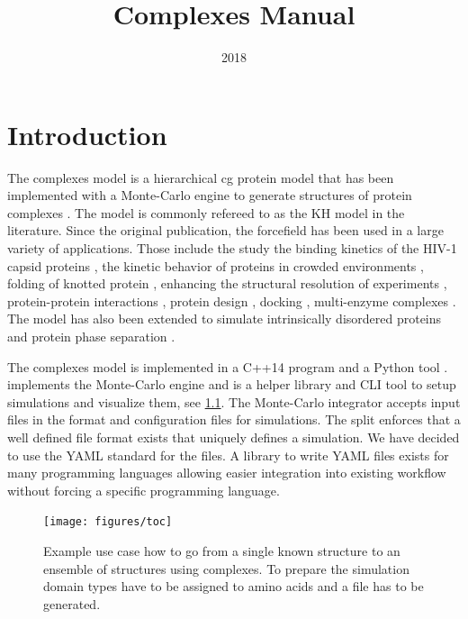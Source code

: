 \documentclass[12pt, twoside]{report}
\begin{document}
\title{Complexes Manual}
\titlepage
\date{2018}
\tableofcontents


\chapter{Introduction}
The complexes model is a hierarchical \gls{cg} protein model that has been
implemented with a Monte-Carlo engine to generate structures of protein
complexes \cite{Kim2008}. The model is commonly refereed to as the \gls{KH}
model in the literature. Since the original publication, the forcefield has been
used in a large variety of applications. Those include the study the binding
kinetics of the HIV-1 capsid proteins \cite{Zhu2015, Sha2017}, the kinetic
behavior of proteins in crowded environments \cite{Kim2013, Kim2010a, Rosen2011,
  Dignon2018a}, folding of knotted protein \cite{Skrbic2012, ABeccara2013,
  Sirur2013, Covino2014a, Sirur2016, Covino2013}, enhancing the structural
resolution of experiments \cite{Rozycki2011, Kofinger2015, Baumlova2014,
  Rozycki2015, Chalupska2017}, protein-protein interactions \cite{Okazaki2012,
  Malinverni2017, Ravikumar2012}, protein design \cite{Yadahalli2014}, docking
\cite{Fortoul2015}, multi-enzyme complexes \cite{Rozycki2017, N2018, Horan2018,
  Rozycki2016}. The model has also been extended to simulate intrinsically
disordered proteins and protein phase separation \cite{Dignon2018a}.

The complexes model is implemented in a \mbox{C++14} program \complexes and a
\mbox{Python} tool \pycomplexes. \complexes implements the Monte-Carlo engine
and \pycomplexes is a helper library and \gls{CLI} tool to setup simulations and
visualize them, see \cref{fig:toc}. The Monte-Carlo integrator accepts input
files in the \cplx format and configuration files for simulations. The split
enforces that a well defined file format exists that uniquely defines a
simulation. We have decided to use the YAML standard \cite{YAML} for the \cplx
files. A library to write YAML files exists for many programming languages
allowing easier integration into existing workflow without forcing a specific
programming language.

\begin{figure}[!ht] \centering
\texttt{[image: figures/toc]}
\caption[\complexes use-case example.]{Example use case how to go from a single
known structure to an ensemble of structures using complexes. To prepare the
simulation domain types have to be assigned to amino acids and a \cplx file has
to be generated.}
\label{fig:toc}
\end{figure}
\end{document}
